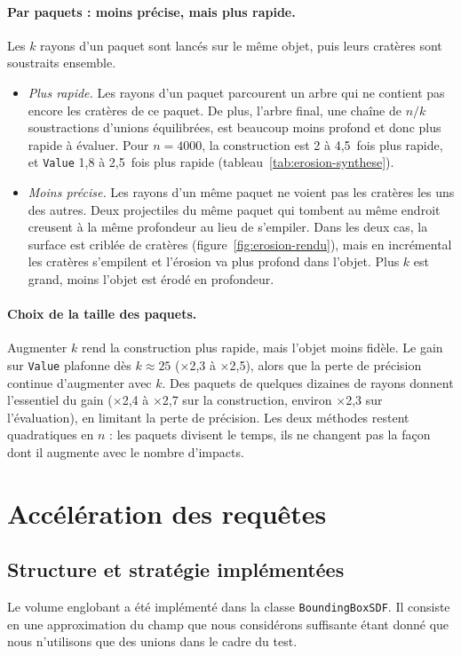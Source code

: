 \documentclass[11pt,a4paper]{article}
\begin{document}
\paragraph{Par paquets : moins précise, mais plus rapide.} Les $k$ rayons d'un paquet sont lancés sur le même objet, puis leurs cratères sont soustraits ensemble.
\begin{itemize}
  \item \emph{Plus rapide.} Les rayons d'un paquet parcourent un arbre qui ne contient pas encore les cratères de ce paquet. De plus, l'arbre final, une chaîne de $n/k$ soustractions d'unions équilibrées, est beaucoup moins profond et donc plus rapide à évaluer. Pour $n = 4000$, la construction est 2 à 4,5~fois plus rapide, et \texttt{Value} 1,8 à 2,5~fois plus rapide (tableau~\ref{tab:erosion-synthese}).
  \item \emph{Moins précise.} Les rayons d'un même paquet ne voient pas les cratères les uns des autres. Deux projectiles du même paquet qui tombent au même endroit creusent à la même profondeur au lieu de s'empiler. Dans les deux cas, la surface est criblée de cratères (figure~\ref{fig:erosion-rendu}), mais en incrémental les cratères s'empilent et l'érosion va plus profond dans l'objet. Plus $k$ est grand, moins l'objet est érodé en profondeur.
\end{itemize}

\paragraph{Choix de la taille des paquets.} Augmenter $k$ rend la construction plus rapide, mais l'objet moins fidèle. Le gain sur \texttt{Value} plafonne dès $k \approx 25$ ($\times$2,3 à $\times$2,5), alors que la perte de précision continue d'augmenter avec $k$. Des paquets de quelques dizaines de rayons donnent l'essentiel du gain ($\times$2,4 à $\times$2,7 sur la construction, environ $\times$2,3 sur l'évaluation), en limitant la perte de précision. Les deux méthodes restent quadratiques en $n$ : les paquets divisent le temps, ils ne changent pas la façon dont il augmente avec le nombre d'impacts.


\section{Accélération des requêtes}
\subsection{Structure et stratégie implémentées}
Le volume englobant a été implémenté dans la classe \texttt{BoundingBoxSDF}. Il consiste en une approximation du champ que nous considérons suffisante étant donné que nous n'utilisons que des unions dans le cadre du test.
\end{document}
